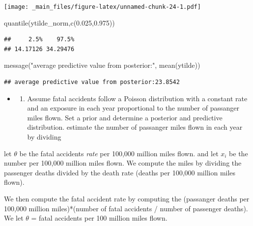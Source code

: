 \documentclass[
]{book}
\newenvironment{Shaded}{\begin{snugshade}}{\end{snugshade}}
\newcommand{\FloatTok}[1]{\textcolor[rgb]{0.00,0.00,0.81}{#1}}
\newcommand{\FunctionTok}[1]{\textcolor[rgb]{0.00,0.00,0.00}{#1}}
\newcommand{\NormalTok}[1]{#1}
\newcommand{\StringTok}[1]{\textcolor[rgb]{0.31,0.60,0.02}{#1}}
\providecommand{\tightlist}{%
  \setlength{\itemsep}{0pt}\setlength{\parskip}{0pt}}
\theoremstyle{definition}
\theoremstyle{definition}
\theoremstyle{definition}
\theoremstyle{definition}
\theoremstyle{remark}
\begin{document}
\texttt{[image: \_main\_files/figure-latex/unnamed-chunk-24-1.pdf]}

\begin{Shaded}
\begin{Highlighting}[]
 \FunctionTok{quantile}\NormalTok{(ytilde\_norm,}\FunctionTok{c}\NormalTok{(}\FloatTok{0.025}\NormalTok{,}\FloatTok{0.975}\NormalTok{))}
\end{Highlighting}
\end{Shaded}

\begin{verbatim}
##     2.5%    97.5% 
## 14.17126 34.29476
\end{verbatim}

\begin{Shaded}
\begin{Highlighting}[]
 \FunctionTok{message}\NormalTok{(}\StringTok{"average predictive value from posterior:"}\NormalTok{, }\FunctionTok{mean}\NormalTok{(ytilde))}
\end{Highlighting}
\end{Shaded}

\begin{verbatim}
## average predictive value from posterior:23.8542
\end{verbatim}

\begin{itemize}
\item
  \begin{enumerate}
  \def\labelenumi{(\alph{enumi})}
  \setcounter{enumi}{1}
  \tightlist
  \item
    Assume fatal accidents follow a Poisson distribution with a constant rate and an exposure in each year proportional to the number of passanger miles flown. Set a prior and determine a posterior and predictive distribution. estimate the number of passanger miles flown in each year by dividing
  \end{enumerate}
\end{itemize}

let \(\theta\) be the fatal accidents \emph{rate} per 100,000 million miles flown. and let \(x_i\) be the number per 100,000 million miles flown. We compute the miles by dividing the passenger deaths divided by the death rate (deaths per 100,000 million miles flown).

We then compute the fatal accident rate by computing the (passanger deaths per 100,000 million miles)*(number of fatal accidents / number of passenger deaths). We let \(\theta\) = fatal accidents per 100 million miles flown.
\end{document}
